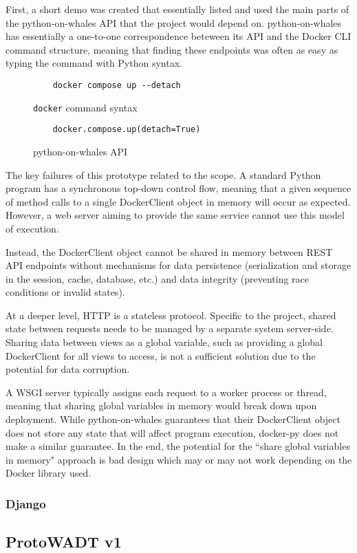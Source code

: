 \documentclass[../design-document.tex]{subfiles}
\begin{document}
First, a short demo was created that essentially listed and used the main parts of the python-on-whales API that the project would depend on. python-on-whales has essentially a one-to-one correspondence beteween its API and the Docker CLI command structure, meaning that finding these endpoints was often as easy as typing the command with Python syntax.

\begin{figure}[H]
	\centering
	\begin{verbatim}
	docker compose up --detach
	\end{verbatim}
	\caption{\texttt{docker} command syntax}
	\label{fig:docker-compose-up-cli}
\end{figure}

\begin{figure}[H]
	\centering
	\begin{verbatim}
	docker.compose.up(detach=True)
	\end{verbatim}
	\caption{python-on-whales API}
	\label{fig:docker-compose-up-python}
\end{figure}

The key failures of this prototype related to the scope. A standard Python program has a synchronous top-down control flow, meaning that a given sequence of method calls to a single DockerClient object in memory will occur as expected. However, a web server aiming to provide the same service cannot use this model of execution.

Instead, the DockerClient object cannot be shared in memory between REST API endpoints without mechanisms for data persistence (serialization and storage in the session, cache, database, etc.) and data integrity (preventing race conditions or invalid states).

At a deeper level, HTTP is a stateless protocol. Specific to the project, shared state between requests needs to be managed by a separate system server-side. Sharing data between views as a global variable, such as providing a global DockerClient for all views to access, is not a sufficient solution due to the potential for data corruption.

A WSGI server typically assigns each request to a worker process or thread, meaning that sharing global variables in memory would break down upon deployment. While python-on-whales guarantees that their DockerClient object does not store any state that will affect program execution, docker-py does not make a similar guarantee. In the end, the potential for the ``share global variables in memory" approach is bad design which may or may not work depending on the Docker library used.




\subsubsection{Django}

\subsection{ProtoWADT v1}
\end{document}
